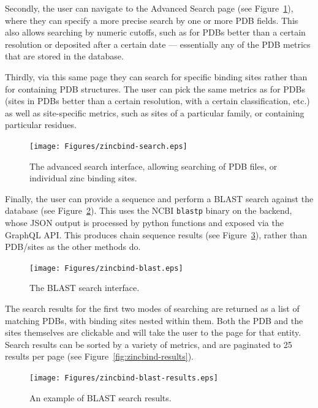 Secondly, the user can navigate to the Advanced Search page (see Figure~\ref{fig:zincbind-search}), where they can specify a more precise search by one or more PDB fields. This also allows searching by numeric cutoffs, such as for PDBs better than a certain resolution or deposited after a certain date --- essentially any of the PDB metrics that are stored in the database.

Thirdly, via this same page they can search for specific binding sites rather than for containing PDB structures. The user can pick the same metrics as for PDBs (sites in PDBs better than a certain resolution, with a certain classification, etc.) as well as site-specific metrics, such as sites of a particular family, or containing particular residues.

\begin{figure}
\centering
\texttt{[image: Figures/zincbind-search.eps]}
\caption[The advanced search interface.]{\label{fig:zincbind-search} The advanced search interface, allowing searching of
PDB files, or individual zinc binding sites.}
\end{figure}

Finally, the user can provide a sequence and perform a BLAST search against the database (see Figure~\ref{fig:zincbind-blast}). This uses the NCBI \texttt{blastp} binary on the backend, whose JSON output is processed by python functions and exposed via the GraphQL API. This produces chain sequence results (see Figure~\ref{fig:zincbind-blast-results}), rather than PDB/sites as the other methods do.

\begin{figure}
\centering
\texttt{[image: Figures/zincbind-blast.eps]}
\caption{\label{fig:zincbind-blast} The BLAST search interface.}
\end{figure}

The search results for the first two modes of searching are returned as a list of matching PDBs, with binding sites nested within them. Both the PDB and the sites themselves are clickable and will take the user to the page for that entity. Search results can be sorted by a variety of metrics, and are paginated to 25 results per page (see Figure~\ref{fig:zincbind-results}).

\begin{figure}
\centering
\texttt{[image: Figures/zincbind-blast-results.eps]}
\caption{\label{fig:zincbind-blast-results} An example of BLAST search results.}
\end{figure}

